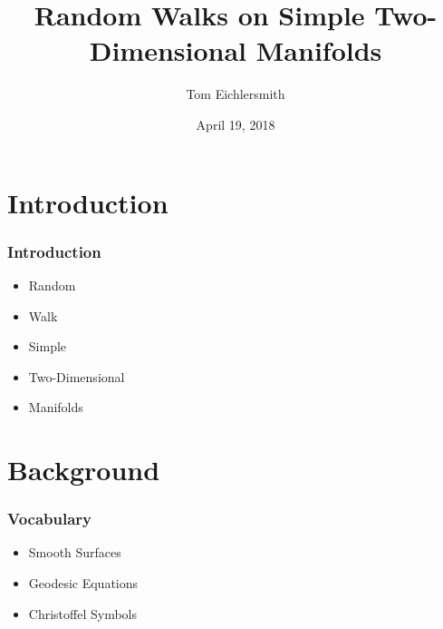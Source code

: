 \documentclass{beamer}
\title[Random Walks]{Random Walks on Simple Two-Dimensional Manifolds} %
\author{Tom Eichlersmith}
\institute[Hamline U]
{
Hamline University \\
\medskip
\texttt{teichlersmith01@hamline.edu}
}
\date{April 19, 2018}
\begin{document}
\begin{frame}
	\titlepage %
\end{frame}


\section{Introduction} 

\begin{frame}

	\frametitle{Introduction}
	
	\begin{itemize}
		\item Random
		\item Walk
		\item Simple
		\item Two-Dimensional
		\item Manifolds
	\end{itemize}

\end{frame}

\section{Background}

\begin{frame}
	
	\frametitle{Vocabulary}
	
	\begin{itemize}
		\item Smooth Surfaces
		\item Geodesic Equations
		\item Christoffel Symbols
	\end{itemize}
	
\end{frame}
\end{document}
